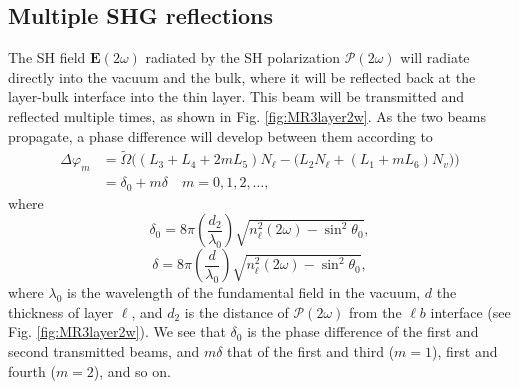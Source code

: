
\subsection{Multiple SHG reflections}

The SH field $\mathbf{E}(2\omega)$ radiated by the SH polarization
$\boldsymbol{\mathcal{P}}(2\omega)$ will radiate directly into the vacuum and
the bulk, where it will be reflected back at the layer-bulk interface into the
thin layer. This beam will be transmitted and reflected multiple times, as shown
in Fig. \ref{fig:MR3layer2w}. As the two beams propagate, a phase difference
will develop between them according to
\begin{equation}\label{m99}
\begin{split}
\Delta\varphi_{m} 
&= \tilde{\Omega}
\Big(
(L_{3} + L_{4} + 2mL_{5})N_{\ell}
 - \big(L_{2}N_{\ell} + (L_{1} + mL_{6})N_{v}\big)
\Big)\\
&= \delta_{0} + m\delta\quad m=0,1,2,\ldots,
\end{split}
\end{equation}
where
\begin{equation}\label{m97}
\delta_{0} =
8\pi\left(\frac{d_{2}}{\lambda_{0}}\right)
\sqrt{n^{2}_{\ell}(2\omega)-\sin^{2}\theta_{0}},
\end{equation}
\begin{equation}\label{m96}
\delta = 
8\pi\left(\frac{d}{\lambda_{0}}\right)\sqrt{n^{2}_{\ell}(2\omega)-\sin^{2}\theta_{0}},
\end{equation}
where $\lambda_{0}$ is the wavelength of the fundamental field in the vacuum,
$d$ the thickness of layer $\ell$, and $d_{2}$ is the distance of
$\boldsymbol{\mathcal{P}}(2\omega)$ from the $\ell b$ interface (see Fig.
\ref{fig:MR3layer2w}). We see that $\delta_{0}$ is the phase difference of the
first and second transmitted beams, and $m\delta$ that of the first and third
($m = 1$), first and fourth ($m = 2$), and so on.

